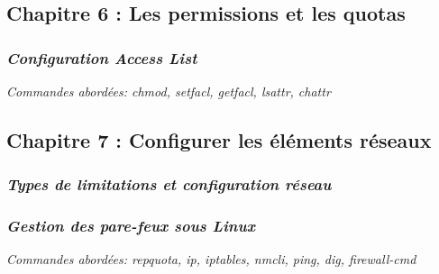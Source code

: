 \documentclass[12pt, a4paper]{article}
\begin{document}
\subsection{\Large Chapitre 6 : Les permissions et les quotas}
\subsubsection{\textit{Configuration Access List}}
\textit{Commandes abordées: \color{red} chmod, setfacl, getfacl, lsattr, chattr\vspace{-0.65em}}
\subsection{\Large Chapitre 7 : Configurer les éléments réseaux}
\subsubsection{\textit{Types de limitations et configuration réseau}}
\subsubsection{\textit{Gestion des pare-feux sous Linux}}
\textit{Commandes abordées: \color{red} repquota, ip, iptables, nmcli, ping, dig, firewall-cmd\vspace{-0.65em}}
\newpage
\vspace*{1cm}
\end{document}
